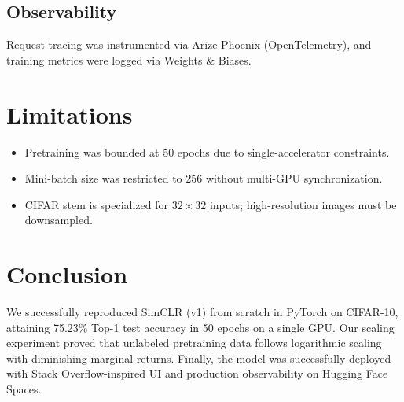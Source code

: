 \documentclass[conference]{IEEEtran}
\begin{document}
\subsection{Observability}
Request tracing was instrumented via Arize Phoenix (OpenTelemetry), and training metrics were logged via Weights \& Biases.

\section{Limitations}
\begin{itemize}
    \item Pretraining was bounded at 50 epochs due to single-accelerator constraints.
    \item Mini-batch size was restricted to 256 without multi-GPU synchronization.
    \item CIFAR stem is specialized for $32 \times 32$ inputs; high-resolution images must be downsampled.
\end{itemize}

\section{Conclusion}
We successfully reproduced SimCLR (v1) from scratch in PyTorch on CIFAR-10, attaining 75.23\% Top-1 test accuracy in 50 epochs on a single GPU. Our scaling experiment proved that unlabeled pretraining data follows logarithmic scaling with diminishing marginal returns. Finally, the model was successfully deployed with Stack Overflow-inspired UI and production observability on Hugging Face Spaces.
\end{document}
